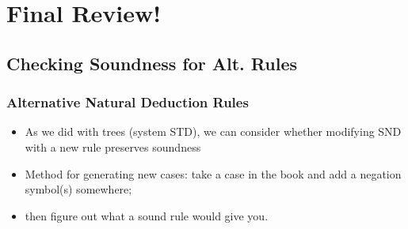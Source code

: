 ﻿%

\setcounter{section}{13}

\section{Final Review!}

\begin{frame}

\scriptsize{\tableofcontents}

\end{frame}

\subsection{Checking Soundness for Alt. Rules}

\begin{frame}
\frametitle{Alternative Natural Deduction Rules}

\begin{itemize}[<+->]

\item As we did with trees (system STD), we can consider whether modifying SND with a new rule preserves soundness

\item Method for generating new cases: take a case in the book and add a negation symbol(s) somewhere; 
\item[] then figure out what a sound rule would give you. 


\end{itemize}
\end{frame}

